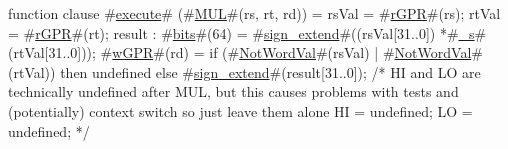 function clause #\hyperref[zexecute]{execute}# (#\hyperref[zMUL]{MUL}#(rs, rt, rd)) =
  {
    rsVal = #\hyperref[zrGPR]{rGPR}#(rs);
    rtVal = #\hyperref[zrGPR]{rGPR}#(rt);
    result : #\hyperref[zbits]{bits}#(64) = #\hyperref[zsignzyextend]{sign\_extend}#((rsVal[31..0]) *#\hyperref[zzys]{\_s}# (rtVal[31..0]));
    #\hyperref[zwGPR]{wGPR}#(rd) = if (#\hyperref[zNotWordVal]{NotWordVal}#(rsVal) | #\hyperref[zNotWordVal]{NotWordVal}#(rtVal)) then
        undefined
      else
        #\hyperref[zsignzyextend]{sign\_extend}#(result[31..0]);
    /* HI and LO are technically undefined after MUL, but this causes problems with tests and
       (potentially) context switch so just leave them alone
    HI = undefined;
    LO = undefined;
    */
  }
